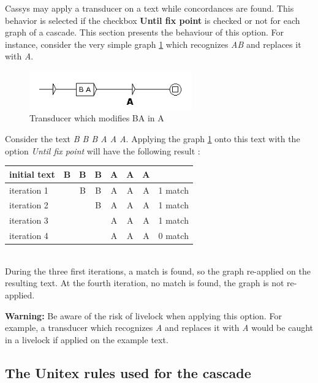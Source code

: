 Cassys may apply a transducer on a text while concordances are found. This behavior is selected if the checkbox \textbf{Until fix point} is checked or not for each graph of a cascade.
This section presents the behaviour of this option.
\bigskip
For instance, consider the very simple graph \ref{fig:AB->A} which recognizes \emph{AB} and
replaces it with \emph{A}. 

\begin{figure}[!htb]
  \centering
  \includegraphics[width=7cm]{resources/img/AB_to_A.png}
  \caption{Transducer which modifies BA in A}
  \label{fig:AB->A}
\end{figure}

Consider the text \emph{B B B A A A}. Applying the graph \ref{fig:AB->A} onto this text with the option \emph{Until fix point} will have the following result :\\

\begin{tabular}{|l|cccccc|r|}
\hline
initial text  &B&B&B&A&A&A&\\
\hline
iteration 1 & &B&B&A&A&A& 1 match\\
iteration 2 & & &B&A&A&A& 1 match\\
iteration 3 & & & &A&A&A& 1 match\\
iteration 4 & & & &A&A&A& 0 match\\
\hline
\end{tabular} \\

During the three first iterations, a match is found, so the graph
re-applied on the resulting text. At the fourth iteration, no match is
found, the graph is not re-applied.

\large{\textbf{Warning:}} Be aware of the risk of livelock when applying this
option. For example, a transducer which recognizes \emph{A} and replaces it with
\emph{A} would be caught in a livelock if applied on the example text.

\subsection{The Unitex rules used for the cascade}

